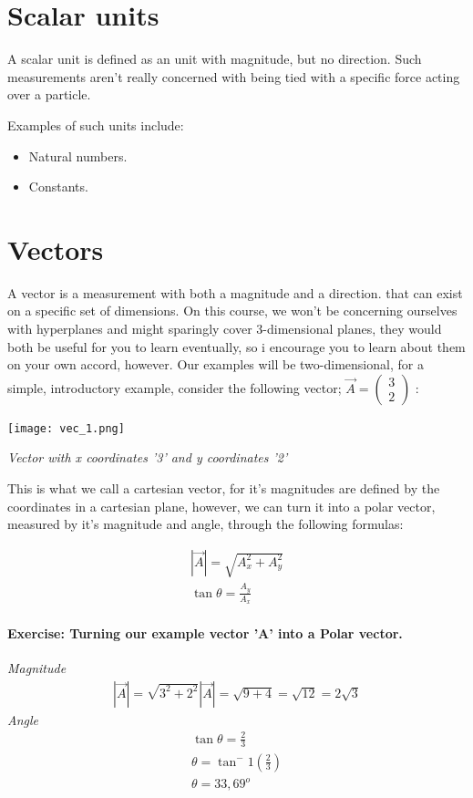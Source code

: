 \documentclass[11pt,fleqn]{book} %
\begin{document}
\section{Scalar units}

A scalar unit is defined as an unit with magnitude, but no direction. Such measurements
aren't really concerned with being tied with a specific force acting over a particle. 

Examples of such units include:
\begin{itemize}
    \item Natural numbers.
    \item Constants.
\end{itemize}

\section{Vectors}

A vector is a measurement with both a magnitude and a direction. that can exist on
a specific set of dimensions. On this course, we won't be concerning ourselves with hyperplanes
and might sparingly cover 3-dimensional planes, they would both be useful for you to learn eventually, so i encourage
you to learn about them on your own accord, however. Our examples will be two-dimensional, for a simple, 
introductory example, consider the following vector; $ \vec{A} = 
\begin{pmatrix}
    3 \\
    2
\end{pmatrix} $ :

\begin{center}
 \texttt{[image: vec\_1.png]}

 \textit{Vector with x coordinates '3' and y coordinates '2'}
\end{center}


This is what we call a cartesian vector, for it's magnitudes are defined by the coordinates in a
cartesian plane, however, we can turn it into a polar vector, measured by it's magnitude and 
angle, through the following formulas:

\begin{gather}
    |\vec{A}| = \sqrt{A_x^2+A_y^2} \\
    \tan \theta = \frac{A_y}{A_x}
\end{gather}

\paragraph{Exercise: Turning our example vector 'A' into a Polar vector.}
\textit{Magnitude}
\begin{gather}
    |\vec{A}| = \sqrt{3^2+2^2}
    |\vec{A}| = \sqrt{9+4} = \sqrt{12} = 2\sqrt{3} 
\end{gather}
\textit{Angle}
\begin{gather}
    \tan \theta = \frac{2}{3} \\
    \theta = \tan^-1(\frac{2}{3}) \\
    \theta = 33,69^o 
\end{gather}
\end{document}
